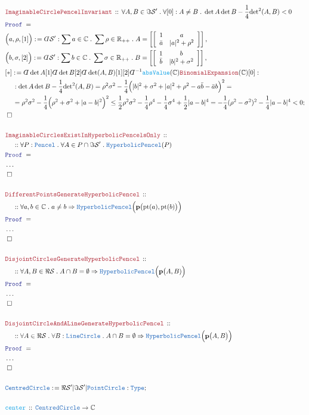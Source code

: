 \documentclass[12pt]{scrartcl}
\newcommand{\TYPE}[1]{\textcolor{NavyBlue}{\mathtt{#1}}}
\newcommand{\FUNC}[1]{\textcolor{Cerulean}{\mathtt{#1}}}
\newcommand{\LOGIC}[1]{\textcolor{Blue}{\mathtt{#1}}}
\newcommand{\THM}[1]{\textcolor{Maroon}{\mathtt{#1}}}
\renewcommand{\.}{\; . \;}
\newcommand{\de}{: \kern 0.1pc =}
\newcommand{\Theorem}[2]{& \THM{#1} \, :: \, #2 \\ & \Proof = \\ }
\newcommand{\DeclareFunc}[2]{& \FUNC{#1} \, :: \, #2 \\}
\newcommand{\NewLine}{\\ & \kern 1pc}
\newcommand{\Page}[1]{ \begin{align*} #1 \end{align*}   }
\newcommand{ \bd }{ \ByDef }
\newcommand{\NoProof}{ & \ldots \\ \EndProof}
\newcommand{\Imply}{\Rightarrow}
\newcommand{\Type}{\TYPE{Type}}
\newcommand{\Reals}{\mathbb{R} }
\newcommand{\Complex}{\mathbb{C}}
\newcommand{\Say}[3]{& #1 \de #2 : #3, \\}
\newcommand{\Conclude}[3]{& #1 \de #2 : #3; \\}
\newcommand{\QED}{\; \square}
\newcommand{\EndProof}{& \QED \\}
\newcommand{\ByDef}{\rotatebox[origin=c]{-180}{$D$}}%
\newcommand{\Proof}{\LOGIC{Proof} \; }
\renewcommand{\S}{\mathcal{S}}
\newcommand{\p}{\mathbf{p}}
\begin{document}
\newpage
\Page{
	\Theorem{ImaginableCirclePencelInvariant}
	{
		\forall A,B \in \Im \S' \.
		\forall [0] : A \neq B \.
		\det A \det B - \frac{1}{4}{\det}^2(A,B) < 0
	}
	\Say{\Big(a, \rho, [1]\Big)}{\bd \S'}
	{   
		\sum a \in \Complex \.
		\sum \rho \in \Reals_{++} \.
		A = 
		\left[\left[
		\begin{array}{cc}
		1 & a \\
		\bar a & |a|^2 + \rho^2
		\end{array}
		\right]\right]
	}
	\Say{\Big(b, \sigma, [2]\Big)}{\bd \S'}
	{   
		\sum b \in \Complex \.
		\sum \sigma \in \Reals_{++} \.
		B = 
		\left[\left[
		\begin{array}{cc}
		1 & b \\
		\bar b & |b|^2 + \sigma^2
		\end{array}
		\right]\right]
	}
	\Conclude{[*]}
	{
		\bd \det A[1] 
		\bd \det B [2] 
		\bd \det(A,B)[1][2]\bd^{-1} 
		\FUNC{absValue}(\Complex) \THM{BinomialExpansion}(\Complex)
		[0]
	}
	{
		\NewLine :
		\det A \det B - \frac{1}{4} {\det}^2(A,B) = 
		\rho^2 \sigma^2 - \frac{1}{4}\Big( |b|^2 + \sigma^2 + |a|^2 + \rho^2 - a \bar b - \bar a b\Big)^2 = 
		\NewLine =
		\rho^2 \sigma^2 - \frac{1}{4} \Big( \rho^2 + \sigma^2 + |a - b|^2\Big)^2 \le
		\frac{1}{2} \rho^2 \sigma^2 - \frac{1}{4}\rho^4 - \frac{1}{4}\sigma^4 + \frac{1}{2}|a - b|^4   = 
		-\frac{1}{4}(\rho^2 - \sigma^2)^2 - \frac{1}{4}|a - b|^4 < 0
	}
	\EndProof
	\\
	\Theorem{ImaginableCirclesExistInHyperbolicPencelsOnly}
	{
		\NewLine ::
		\forall P : \TYPE{Pencel} \.
		\forall A \in P \cap \Im \S' \.
		\TYPE{HyperbolicPencel}(P)
	}
	\NoProof
	\\
	\Theorem{DifferentPointsGenerateHyperbolicPencel}
	{
		\NewLine ::
		\forall a,b \in \Complex \. 
		a \neq b \Imply
		\TYPE{HyperbolicPencel}\Big(\p\big(\mathrm{pt}(a),\mathrm{pt}(b)\big)\Big)
	}
	\NoProof
	\\
	\Theorem{DisjointCirclesGenerateHyperbolicPencel}
	{
		\NewLine ::
		\forall A,B \in \Re \S \. 
		A \cap B = \emptyset \Imply
		\TYPE{HyperbolicPencel}\Big(\p\big(A,B)\Big)
	}
	\NoProof
	\\
	\Theorem{DisjointCircleAndALineGenerateHyperbolicPencel}
	{
		\NewLine ::
		\forall A \in \Re \S \. 
		\forall B : \TYPE{LineCircle} \.
		A \cap B = \emptyset \Imply
		\TYPE{HyperbolicPencel}\Big(\p\big(A,B\big) \Big)
	}
	\NoProof
	\\
	\Conclude{\TYPE{CentredCircle}}{\Re \S' | \Im \S' | \TYPE{PointCircle}}{\Type}
	\\
	\DeclareFunc{center}{\TYPE{CentredCircle} \to \Complex}
}
\end{document}
